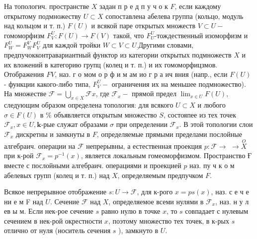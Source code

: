 \documentclass[10pt]{article}
\begin{document}
На топологич. пространстве $X$ задан п р е д п у ч о к $F$, если каждому открытому подмножеству $U \subset X$ сопоставлена абелева группа (кольцо, модуль над кольцом и т. п.) $F(U)$ и всякой паре открытых множеств $V \subset U-$ гомоморфизм $F_{V}^{U}: F(U) \rightarrow F(V)$ такой, что $F_{U}^{U}$-тождественный изоморфизм и $F_{W}^{U}=F_{W}^{V} F_{V}^{U}$ для каждой тройки $W \subset V \subset U_{:}$Другими словами, предпучокконтравариантный функтор из категории открытых подмножеств $X$ и их вложений в категорию групц (колец и т. п.) и их гомоморфицзмов. Отображения $F V$, наз. г о мом о р ф и м ам ио г р а ич вния (напр., если $F(U)$ - функции какого-либо типа, $F_{V}^{U}-$ ограничения их на меньшее подмножество). На множестве $\mathscr{F}=\bigcup_{x \in X} \mathscr{F} x$, где $\mathscr{F}_{x}-$ прямой предел $\lim _{x \in U} F(U)$, следующим образом определена топология: для всякого $U \subset X$ и любого $\sigma \in F(U)$ в \% объявляется открытым множество $S$, состояпее из тех точек $\mathscr{F}_{x}, x \in U, \mathbf{k}$-рые служат образами $\sigma$ при определении $\mathscr{F}_{x}$. В этой топологии слои $\mathscr{F}_{x}$ дискретны и замкнуты в $F$, определяемые прямыми пределами послойные алгебраич. операции на $\mathscr{F}$ непрерывны, а естественная проекция $p: \mathscr{F} \rightarrow$ $\rightarrow \stackrel{O}{X}$ при к-рой $\mathscr{F}_{x}=p^{-1}(x)$, является локальным гомеоморфизмом. Пространство Ғ вместе с послойными алгебраич. операциями и проекцией $p$ наз. пу ч к о м абелевых групп (колец и т. п.) над $X$, определяемым предпучком $F$.



Всякое непрерывное отображение $s: U \rightarrow \mathscr{F}$, для к-рого $x=p s(x)$, наз. с е ч е ни е м F над $U$. Сечение $\mathcal{F}$ над $X$, определяемое всеми нулями в $\mathcal{F}_{x}$, наз. н у л ев ы м. Если нек-рое сечение $s$ равно нулю в точке $x$, то $s$ совпадает с нулевым сечением в нек-рой окрестности $x$, поэтому множество тех точек, в к-рых $s$ отлично от нуля (носитель сечения $s$ ), замкнуто в $U$.
\end{document}
